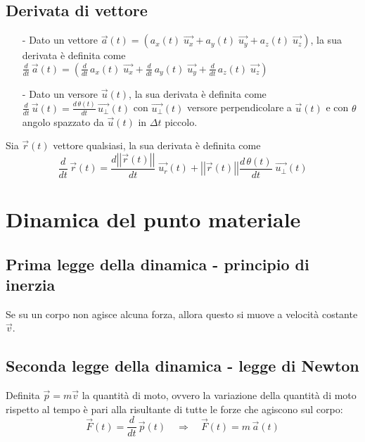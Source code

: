 \documentclass[a4paper]{article}
\newcommand\dt{\frac{d}{dt}\,}
\newcommand\vmod[1]{\left|\left|{#1}\right|\right|}
\begin{document}
\subsection{Derivata di vettore}
\begin{itemize}
	\item[-] Dato un vettore \(\vec{a}(t) = (a_x(t) \; \vec{u_x} + a_y(t) \; \vec{u_y} + a_z(t) \; \vec{u_z})\), la sua derivata è definita come \\
	\(\displaystyle \dt \vec{a}(t) = \left(\dt a_x(t) \; \vec{u_x} + \dt a_y(t) \; \vec{u_y} + \dt a_z(t) \; \vec{u_z}\right)\)
	\item[-] Dato un versore \(\vec{u}(t)\), la sua derivata è definita come \(\displaystyle \dt \vec{u}(t) = \frac{d \, \theta(t)}{dt} \, \vec{u_\perp}(t)\)
	con \(\vec{u_\perp}(t)\) versore perpendicolare a \(\vec{u}(t)\) e con \(\theta\) angolo spazzato da \(\vec{u}(t)\) in \(\Delta t\) piccolo.
\end{itemize}
Sia \(\vec{r}(t)\) vettore qualsiasi, la sua derivata è definita come
\[\dt \vec{r}(t) = \frac{d \vmod{\vec{r}(t)}}{dt} \; \vec{u_r}(t) + \vmod{\vec{r}(t)} \frac{d \, \theta(t)}{dt} \; \vec{u_\perp}(t)\]

\newpage


\section{Dinamica del punto materiale}
\subsection{Prima legge della dinamica - principio di inerzia}
Se su un corpo non agisce alcuna forza, allora questo si muove a velocità costante \(\vec{v}\).

\subsection{Seconda legge della dinamica - legge di Newton}
Definita \(\vec{p} = m \vec{v}\) la quantità di moto, ovvero la variazione della quantità di moto rispetto al tempo è pari alla
risultante di tutte le forze che agiscono sul corpo:
\[\vec{F}(t) = \dt \vec{p}(t) \quad \Rightarrow \quad \vec{F}(t) = m \, \vec{a}(t)\]
\end{document}
